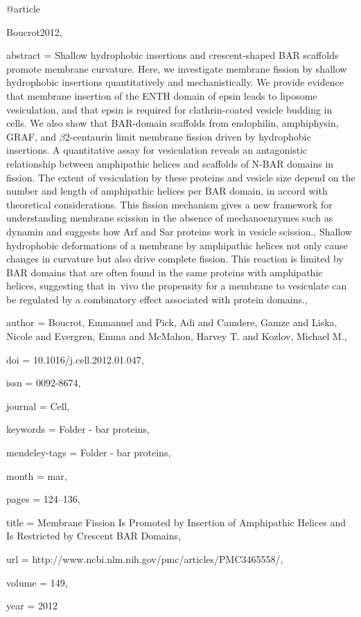 @article{Boucrot2012,

abstract = {Shallow hydrophobic insertions and crescent-shaped BAR scaffolds promote membrane curvature. Here, we investigate membrane fission by shallow hydrophobic insertions quantitatively and mechanistically. We provide evidence that membrane insertion of the ENTH domain of epsin leads to liposome vesiculation, and that epsin is required for clathrin-coated vesicle budding in cells. We also show that BAR-domain scaffolds from endophilin, amphiphysin, GRAF, and $\beta$2-centaurin limit membrane fission driven by hydrophobic insertions. A quantitative assay for vesiculation reveals an antagonistic relationship between amphipathic helices and scaffolds of N-BAR domains in fission. The extent of vesiculation by these proteins and vesicle size depend on the number and length of amphipathic helices per BAR domain, in accord with theoretical considerations. This fission mechanism gives a new framework for understanding membrane scission in the absence of mechanoenzymes such as dynamin and suggests how Arf and Sar proteins work in vesicle scission., Shallow hydrophobic deformations of a membrane by amphipathic helices not only cause changes in curvature but also drive complete fission. This reaction is limited by BAR domains that are often found in the same proteins with amphipathic helices, suggesting that in vivo the propensity for a membrane to vesiculate can be regulated by a combinatory effect associated with protein domains.},

author = {Boucrot, Emmanuel and Pick, Adi and Camdere, Gamze and Liska, Nicole and Evergren, Emma and McMahon, Harvey T. and Kozlov, Michael M.},

doi = {10.1016/j.cell.2012.01.047},

issn = {0092-8674},

journal = {Cell},

keywords = {Folder - bar proteins},

mendeley-tags = {Folder - bar proteins},

month = {mar},

pages = {124--136},

title = {{Membrane Fission Is Promoted by Insertion of Amphipathic Helices and Is Restricted by Crescent BAR Domains}},

url = {http://www.ncbi.nlm.nih.gov/pmc/articles/PMC3465558/},

volume = {149},

year = {2012}

}

